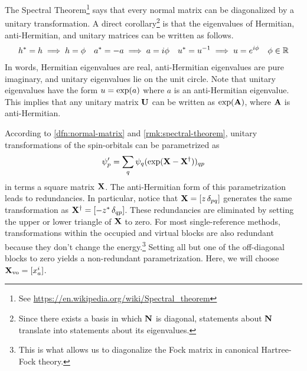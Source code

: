 \documentclass[11pt]{article}
\numberwithin{equation}{section}
\begin{document}
\begin{rmk}
\label{rmk:spectral-theorem}
The Spectral Theorem\footnote{See \url{https://en.wikipedia.org/wiki/Spectral_theorem}} says that every normal matrix can be diagonalized by a unitary transformation.
A direct corollary\footnote{Since there exists a basis in which $\mathbf{N}$ is diagonal, statements about $\mathbf{N}$ translate into statements about its eigenvalues.} is that the eigenvalues of Hermitian, anti-Hermitian, and unitary matrices can be written as follows.
\begin{align}
  h^*
=
  h
\implies
  h
=
  \phi 
&&
  a^*
=
-
  a
\implies
  a
=
  i\phi 
&&
  u^*
=
  u^{-1}
\implies
  u
=
  e^{i\phi }
&&
  \phi 
\in
  \mathbb{R}
\end{align}
In words, Hermitian eigenvalues are real, anti-Hermitian eigenvalues are pure imaginary, and unitary eigenvalues lie on the unit circle.
Note that unitary eigenvalues have the form $u=\mathrm{exp}(a)$ where $a$ is an anti-Hermitian eigenvalue.
This implies that any unitary matrix $\mathbf{U}$ can be written as $\mathrm{exp}(\mathbf{A})$, where $\mathbf{A}$ is anti-Hermitian.
\end{rmk}

\begin{rmk}
According to \cref{dfn:normal-matrix} and \cref{rmk:spectral-theorem}, unitary transformations of the spin-orbitals can be parametrized as
\begin{align}
\label{eq:spin-orbital-transformation}
  \psi _p'
=
  \sum_q
  \psi _q
  (\mathrm{exp}(\mathbf{X} - \mathbf{X}^\dagger))_{qp}
\end{align}
in terms a square matrix $\mathbf{X}$.
The anti-Hermitian form of this parametrization leads to redundancies.
In particular, notice that $\mathbf{X}=[z\,\delta _{pq}]$ generates the same transformation as $\mathbf{X}^\dagger=[-z^*\,\delta _{qp}]$.
These redundancies are eliminated by setting the upper or lower triangle of $\mathbf{X}$ to zero.
For most single-reference methods, transformations within the occupied and virtual blocks are also redundant because they don't change the energy.\footnote{This is what allows us to diagonalize the Fock matrix in canonical Hartree-Fock theory.}
Setting all but one of the off-diagonal blocks to zero yields a non-redundant parametrization.
Here, we will choose $\mathbf{X}_{\mathrm{vo}}=[x_a^i]$.
\end{rmk}
\end{document}
